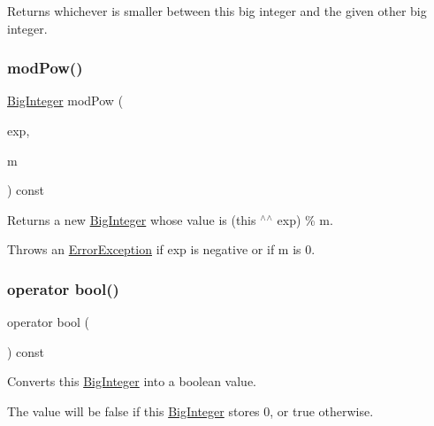 Returns whichever is smaller between this big integer and the given other big integer. 

\mbox{\label{classBigInteger_a0784fc13afdca5e439e2cb99dc2b1055}} 
\subsubsection{\texorpdfstring{mod\+Pow()}{modPow()}}
{\footnotesize\ttfamily \mbox{\hyperlink{classBigInteger}{Big\+Integer}} mod\+Pow (\begin{DoxyParamCaption}\item[{const \mbox{\hyperlink{classBigInteger}{Big\+Integer}} \&}]{exp,  }\item[{const \mbox{\hyperlink{classBigInteger}{Big\+Integer}} \&}]{m }\end{DoxyParamCaption}) const}



Returns a new \mbox{\hyperlink{classBigInteger}{Big\+Integer}} whose value is (this $^\wedge$$^\wedge$ exp) \% m. 

Throws an \mbox{\hyperlink{classErrorException}{Error\+Exception}} if exp is negative or if m is 0. \mbox{\label{classBigInteger_a67b76affb3b5d35fa419ac234144038b}} 
\subsubsection{\texorpdfstring{operator bool()}{operator bool()}}
{\footnotesize\ttfamily operator bool (\begin{DoxyParamCaption}{ }\end{DoxyParamCaption}) const\hspace{0.3cm}{\ttfamily [explicit]}}



Converts this \mbox{\hyperlink{classBigInteger}{Big\+Integer}} into a boolean value. 

The value will be false if this \mbox{\hyperlink{classBigInteger}{Big\+Integer}} stores 0, or true otherwise. \mbox{\label{classBigInteger_a48d27bd92e68c69527589ea65a9af69f}} 
